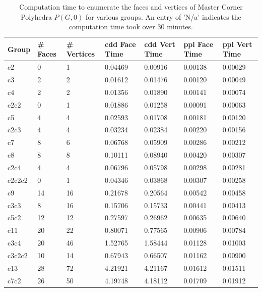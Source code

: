 \documentclass{article}
\begin{document}
	\begin{table}[]
		\centering
		\caption{Computation time to enumerate the faces and vertices of Master Corner Polyhedra $P(G, 0)$ for various groups. An entry of 'N/a' indicates the computation time took over 30 minutes.}
		\label{enumtimes}
		\begin{tabular}{@{}lllllll@{}}
			\toprule
			Group    & \# Faces & \# Vertices & cdd Face Time & cdd Vert Time & ppl Face  Time & ppl Vert Time \\
			\midrule
			c2    & 0   & 1     & 0.04469   & 0.00916   & 0.00138    & 0.00029    \\ 
			c3    & 2   & 2     & 0.01612   & 0.01476   & 0.00120    & 0.00049    \\
			c4       & 2   & 2     & 0.01356   & 0.01890   & 0.00141    & 0.00074    \\
			c2c2     & 0   & 1     & 0.01886   & 0.01258   & 0.00091    & 0.00063    \\
			c5       & 4   & 4     & 0.02593   & 0.01708   & 0.00181    & 0.00120    \\
			c2c3     & 4   & 4     & 0.03234   & 0.02384   & 0.00220    & 0.00156    \\
			c7       & 8   & 6     & 0.06768   & 0.05909   & 0.00286    & 0.00212    \\
			c8       & 8   & 8     & 0.10111   & 0.08940   & 0.00420    & 0.00307    \\
			c2c4     & 4   & 4     & 0.06796   & 0.05798   & 0.00298    & 0.00281    \\
			c2c2c2   & 0   & 1     & 0.04346   & 0.03868   & 0.00307    & 0.00258    \\
			c9       & 14  & 16    & 0.21678   & 0.20564   & 0.00542    & 0.00458    \\
			c3c3     & 8   & 16    & 0.15706   & 0.15733   & 0.00441    & 0.00413    \\
			c5c2     & 12  & 12    & 0.27597   & 0.26962   & 0.00635    & 0.00640    \\
			c11      & 20  & 22    & 0.80071   & 0.77565   & 0.00906    & 0.00784    \\
			c3c4     & 20  & 46    & 1.52765   & 1.58444   & 0.01128    & 0.01003    \\
			c3c2c2   & 10  & 14    & 0.67943   & 0.66507   & 0.01162    & 0.00900    \\
			c13      & 28  & 72    & 4.21921   & 4.21167   & 0.01612    & 0.01511    \\
			c7c2     & 26  & 50    & 4.19748   & 4.18112   & 0.01709    & 0.01912    \\

\end{tabular}
\end{table}
\end{document}
